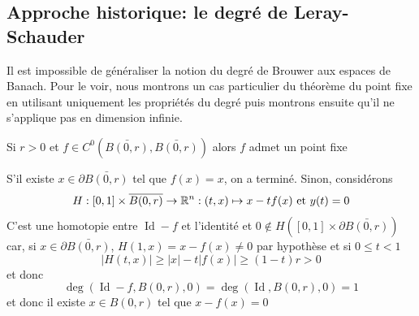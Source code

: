 \documentclass[memoire.tex]{subfiles}
\begin{document}
\subsection{Approche historique: le degré de Leray-Schauder}
Il est impossible de généraliser la notion du degré de Brouwer aux espaces de Banach. Pour le voir, nous montrons un cas particulier du théorème du point fixe en utilisant uniquement les propriétés du degré puis montrons ensuite qu'il ne s'applique pas en dimension infinie.
\begin{proposition}
    Si $r>0$ et $f\in C^0(\bar{B(0,r)},\bar{B(0,r)})$ alors $f$ admet un point fixe
\end{proposition}
\begin{preuve}
    S'il existe $x\in\partial \bar{B(0,r)}$ tel que $f(x)=x$, on a terminé. Sinon, 
    considérons 
    \begin{equation*}
        H: [0,1]\times \overline{B(0,r)}\rightarrow \mathbb{R}^n: (t,x)
        \mapsto x-tf(x)\text{ et } y(t)=0
    \end{equation*}
    C'est une homotopie entre $\operatorname{Id}-f$ et 
    l'identité et $0\notin H([0,1]\times\partial \bar{B(0,r)})
    $ car, si $x\in\partial \bar{B(0,r)}$, $H(1,x)=x-f(x)\neq 
    0$ par hypothèse et si $0\leq t<1$
    \begin{equation*}
        |H(t,x)|\geq |x|-t|f(x)|\geq (1-t)r>0
    \end{equation*}
    et donc
    \begin{equation*}
        \operatorname*{deg}(\operatorname{Id}-f,B(0,r),0)
        =\operatorname*{deg}(\operatorname{Id},B(0,r),0)=1
    \end{equation*}
    et donc il existe $x\in B(0,r)$ tel que $x-f(x)=0$
\end{preuve}
\end{document}

